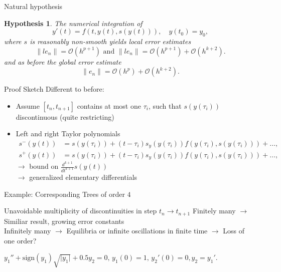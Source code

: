 \documentclass{beamer}
\newcommand{\nologo}{\setbeamertemplate{logo}{}}
\newtheorem{hypothesis}{Hypothesis}
\begin{document}
{
\nologo
\begin{frame}{Natural hypothesis}
  \begin{hypothesis}
    The numerical integration of
    \[
      y'(t) = f(t, y(t), s(y(t))), \quad y(t_{0}) = y_{0},
    \]
    where $s$ is reasonably non-smooth yields local error estimates
    \[
      \lVert le_{n} \rVert = \mathcal{O} (h^{p+1}) \text{ and } \lVert le_{n} \rVert = \mathcal{O} (h^{p+1}) + \mathcal{O}(h^{k+2}).
    \]
    and as before the global error estimate
    \[
      \lVert e_{n} \rVert = \mathcal{O} (h^{p}) + \mathcal{O} (h^{k+2}). 
    \]
  \end{hypothesis}
\end{frame}
}

\begin{frame}{Proof Sketch}
  Different to before:
  \begin{itemize}
    \item Assume $[t_{n}, t_{n+1}]$ contains at most one $\tau _{i}$, such that $s(y(\tau_{i}))$ discontinuous (quite restricting)
    \item Left and right Taylor polynomials
    \begin{align*}
      s^{-}(y(t)) &= s(y(\tau_{i})) + (t-\tau_{i}) s_{y}(y(\tau_{i}))f(y(\tau_{i}), s(y(\tau_{i}))) + \dots,\\
      s^{+}(y(t)) &= s(y(\tau_{i})) + (t-\tau_{i}) s_{y}(y(\tau_{i}))f(y(\tau_{i}), s(y(\tau_{i}))) + \dots,
    \end{align*}
    $\to$ bound on $\frac{d^{k+1}}{dt^{k+1}}s(y(t))$ \\
    $\to$ generalized elementary differentials
  \end{itemize}
\end{frame}

\begin{frame}{Example: Corresponding Trees of order $4$}
  
  
\end{frame}
\begin{frame}{Unavoidable multiplicity of discontinuities in step $t_{n} \to t_{n+1}$}
  \vspace*{-1cm}
  Finitely many $\to$ Similiar result, growing error constants\\
  Infinitely many $\to$ Equilibria or infinite oscillations in finite time
  $\to$ Loss of one order?
   
  $y_{1}'' + \mathrm{sign}(y_{1}) \sqrt{\lvert y_{1} \rvert } + 0.5 y_{2} = 0,\, y_{1}(0) = 1,\, y_{2}'(0) = 0, y_{2} = y_{1}'$.
\end{frame}
\end{document}
